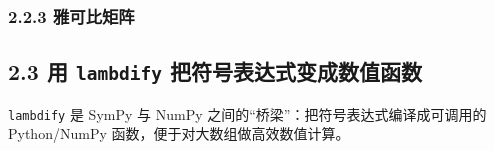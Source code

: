 \subsubsection{2.2.3 雅可比矩阵}\label{ux96c5ux53efux6bd4ux77e9ux9635}

\begin{Shaded}
\begin{Highlighting}[]
\OperatorTok{=}\NormalTok{)}
\OperatorTok{=}\OperatorTok{**} \OperatorTok{+}
\OperatorTok{=}\OperatorTok{{-}}\OperatorTok{**}
\OperatorTok{=}
\end{Highlighting}
\end{Shaded}

\begin{Shaded}
\begin{Highlighting}[]
\end{Highlighting}
\end{Shaded}

\subsection{\texorpdfstring{2.3 用 \texttt{lambdify}
把符号表达式变成数值函数}{2.3 用 lambdify 把符号表达式变成数值函数}}\label{ux7528-lambdify-ux628aux7b26ux53f7ux8868ux8fbeux5f0fux53d8ux6210ux6570ux503cux51fdux6570}

\texttt{lambdify} 是 SymPy 与 NumPy
之间的``桥梁''：把符号表达式编译成可调用的 Python/NumPy
函数，便于对大数组做高效数值计算。

\begin{Shaded}
\begin{Highlighting}[]
\OperatorTok{=}\NormalTok{)}
\OperatorTok{=}\OperatorTok{**} \OperatorTok{+} \OperatorTok{*}\OperatorTok{+} 
\OperatorTok{=}\NormalTok{)}
\NormalTok{))}
\NormalTok{))}
\OperatorTok{=}
\NormalTok{))}
\end{Highlighting}
\end{Shaded}

